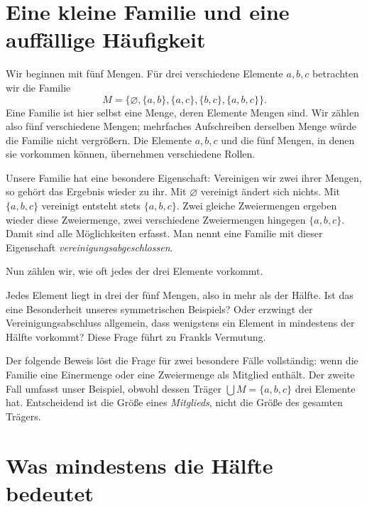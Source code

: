 \newcommand{\FranklProofText}[2]{%
  \href{\FranklEditionDirectory_B46-frankl-proofs.pdf\#frankl.proof.#1}{#2}%
}
\section*{Eine kleine Familie und eine auffällige Häufigkeit}
\hypertarget{frankl.reading.example}{}

Wir beginnen mit fünf Mengen. Für drei verschiedene Elemente
\(a,b,c\) betrachten wir die Familie
\[
  M=\{\varnothing,\{a,b\},\{a,c\},\{b,c\},\{a,b,c\}\}.
\]
Eine Familie ist hier selbst eine Menge, deren Elemente Mengen
sind. Wir zählen also fünf verschiedene Mengen; mehrfaches
Aufschreiben derselben Menge würde die Familie nicht vergrößern.
Die Elemente \(a,b,c\) und die fünf Mengen, in denen sie
vorkommen können, übernehmen verschiedene Rollen.

Unsere Familie hat eine besondere Eigenschaft: Vereinigen wir
zwei ihrer Mengen, so gehört das Ergebnis wieder zu ihr.
Mit \(\varnothing\) vereinigt ändert sich nichts. Mit
\(\{a,b,c\}\) vereinigt entsteht stets \(\{a,b,c\}\).
Zwei gleiche Zweiermengen ergeben wieder diese Zweiermenge,
zwei verschiedene Zweiermengen hingegen \(\{a,b,c\}\).
Damit sind alle Möglichkeiten erfasst. Man nennt eine Familie
mit dieser Eigenschaft \emph{vereinigungsabgeschlossen}.

Nun zählen wir, wie oft jedes der drei Elemente vorkommt.

\FranklIncidenceTable

Jedes Element liegt in drei der fünf Mengen, also in mehr als
der Hälfte. Ist das eine Besonderheit unseres symmetrischen
Beispiels? Oder erzwingt der Vereinigungsabschluss allgemein,
dass wenigstens ein Element in mindestens der Hälfte vorkommt?
Diese Frage führt zu Frankls Vermutung.

Der folgende Beweis löst die Frage für zwei besondere Fälle
vollständig: wenn die Familie eine Einermenge oder eine
Zweiermenge als Mitglied enthält. Der zweite Fall umfasst
unser Beispiel, obwohl dessen Träger \(\bigcup M=\{a,b,c\}\)
drei Elemente hat. Entscheidend ist die Größe eines
\emph{Mitglieds}, nicht die Größe des gesamten Trägers.

\par{}
\section*{Was \glqq mindestens die Hälfte\grqq{} bedeutet}
\hypertarget{frankl.reading.frequency}{}

